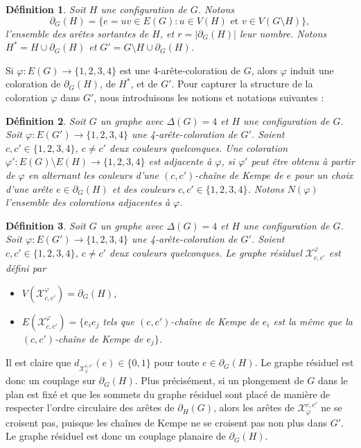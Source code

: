 \documentclass[10pt,a4paper]{article}
\newtheorem{definition}{Définition}
\begin{document}
\begin{definition}
Soit $H$ une configuration de $G$. Notons
$$
\partial_G(H) = \{e =uv \in E(G) : u \in V(H)\textrm{ et }v \in V(G \setminus H)\},
$$ l'ensemble des arêtes sortantes de $H$, et $r=|\partial_G(H)|$ leur nombre.
Notons $H^* = H \cup \partial_G(H)$ et $G'=G\setminus H \cup \partial_G(H)$.
\label{de:ring}
\end{definition}

Si $\varphi:E(G)\to \{1,2,3,4\}$ est une 4-arête-coloration de $G$, alors $\varphi$ induit une coloration de $\partial_G(H)$, de $H^*$, et de $G'$. Pour capturer la structure de la coloration $\varphi$ dans $G'$, nous introduisons les notions et notations suivantes :

\begin{definition}
Soit $G$ un graphe avec $\Delta(G)=4$ et $H$ une configuration de $G$.
Soit $\varphi:E(G')\to \{1,2,3,4\}$ une 4-arête-coloration de $G'$. 
Soient $c, c' \in \{1,2,3,4\}$, $c\ne c'$ deux couleurs quelconques. 
Une coloration $\varphi':E(G)\setminus E(H)\to \{1,2,3,4\}$ est \emph{adjacente} à $\varphi$, si $\varphi'$ peut être obtenu à partir de $\varphi$ en alternant les couleurs d'une $(c,c')$-chaîne de Kempe de $e$ pour un choix d'une arête $e\in\partial_G(H)$ et des couleurs $c,c'\in\{1,2,3,4\}$. Notons $N(\varphi)$ l'ensemble des colorations adjacentes à $\varphi$.
\end{definition}

\begin{definition}
Soit $G$ un graphe avec $\Delta(G)=4$ et $H$ une configuration de $G$.
Soit $\varphi:E(G')\to \{1,2,3,4\}$ une 4-arête-coloration de $G'$. 
Soient $c, c' \in \{1,2,3,4\}$, $c\ne c'$ deux couleurs quelconques. 
Le \emph{graphe résiduel}
$\mathcal{X}^{\varphi}_{c,c'}$ est défini par
\begin{itemize}
\item $V(\mathcal{X}^{\varphi}_{c,c'}) = \partial_G(H)$, 
\item $E(\mathcal{X}^{\varphi}_{c,c'}) = \{ e_ie_j$ tels que $(c,c')$-chaîne de Kempe de $e_i$ est la même que la $(c,c')$-chaîne de Kempe de $e_j\}$.
\end{itemize}
\end{definition}

Il est claire que $d_{\mathcal{X}_{\varphi}^{c,c'}}(e)\in\{0,1\}$ pour toute $e\in \partial_G(H)$. Le graphe résiduel est donc un couplage sur $\partial_G(H)$. Plus précisément, si un plongement de $G$ dans le plan est fixé et que les sommets du graphe résiduel sont placé de manière de respecter l'ordre circulaire des arêtes de $\partial_H(G)$, alors les arêtes de $\mathcal{X}_{\varphi}^{c,c'}$ ne se croisent pas, puisque les chaînes de Kempe ne se croisent pas non plus dans $G'$. Le graphe résiduel est donc un couplage planaire de $\partial_G(H)$.
\end{document}

